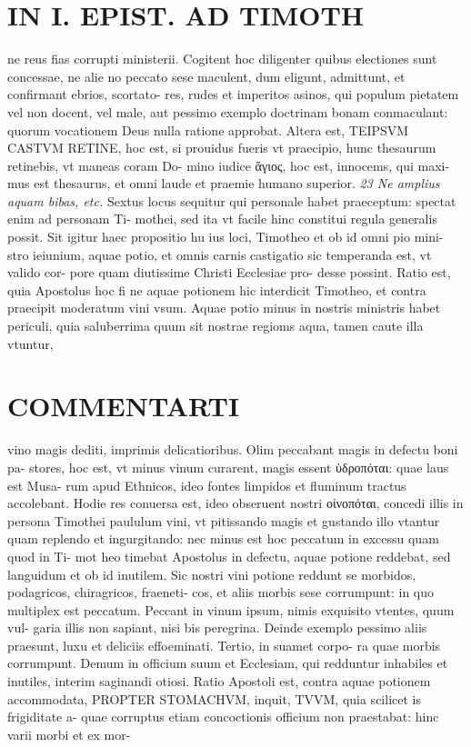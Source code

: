 \documentclass{article}
\begin{document}
\begin{pages}
\section*{IN I. EPIST. AD TIMOTH }
\marginpar{[ p.139 ]}\pstart ne reus fias corrupti ministerii. Cogitent hoc diligenter quibus electiones sunt concessae, ne alie no peccato sese maculent, dum eligunt, admittunt, et confirmant ebrios, scortato- res, rudes et imperitos asinos, qui populum pietatem vel non docent, vel male, aut pessimo exemplo doctrinam bonam conmaculant: quorum vocationem Deus nulla ratione approbat.  \pend\pstart Altera est, TEIPSVM CASTVM RETINE, hoc est, si prouidus fueris vt praecipio, hunc thesaurum retinebis, vt maneas coram Do- mino iudice ἅγιος, hoc est, innocems, qui maxi- mus est thesaurus, et omni laude et praemie humano superior.  \pend
\textit{23 Ne amplius aquam bibas, etc. }\pstart Sextus locus sequitur qui personale habet praeceptum: spectat enim ad personam Ti- mothei, sed ita vt facile hinc constitui regula generalis possit. Sit igitur haec propositio hu ius loci, Timotheo et ob id omni pio mini- stro ieiunium, aquae potio, et omnis carnis castigatio sic temperanda est, vt valido cor- pore quam diutissime Christi Ecclesiae pro- desse possint. Ratio est, quia Apostolus hoc fi ne aquae potionem hic interdicit Timotheo, et contra praecipit moderatum vini vsum. Aquae potio minus in nostris ministris habet periculi, quia saluberrima quum sit nostrae regioms aqua, tamen caute illa vtuntur,  \pend
\marginpar{[ p.140 ]}
\section*{COMMENTARTI }\pstart vino magis dediti, imprimis delicatioribus. Olim peccabant magis in defectu boni pa- stores, hoc est, vt minus vinum curarent, magis essent ὑδροπόται: quae laus est Musa- rum apud Ethnicos, ideo fontes limpidos et fluminum tractus accolebant. Hodie res conuersa est, ideo obseruent nostri οἰνοπόται, concedi illis in persona Timothei paululum vini, vt pitissando magis et gustando illo vtantur quam replendo et ingurgitando: nec minus est hoc peccatum in excessu quam quod in Ti- mot heo timebat Apostolus in defectu, aquae potione reddebat, sed languidum et ob id inutilem. Sic nostri vini potione reddunt se morbidos, podagricos, chiragricos, fraeneti- cos, et aliis morbis sese corrumpunt: in quo multiplex est peccatum. Peccant in vinum ipsum, nimis exquisito vtentes, quum vul- garia illis non sapiant, nisi bis peregrina. Deinde exemplo pessimo aliis praesunt, luxu et deliciis effoeminati. Tertio, in suamet corpo- ra quae morbis corrumpunt. Demum in officium suum et Ecclesiam, qui redduntur inhabiles et inutiles, interim saginandi otiosi.  \pend\pstart Ratio Apostoli est, contra aquae potionem accommodata, PROPTER STOMACHVM, inquit, TVVM, quia scilicet is frigiditate a- quae corruptus etiam concoctionis officium non praestabat: hinc varii morbi et ex mor-  \pend

\end{pages}
\end{document}
